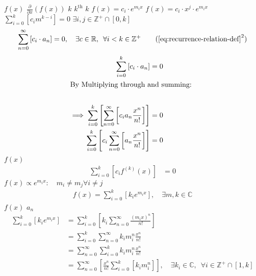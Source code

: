 \documentclass{article}
\begin{document}
$f(x)$
$\frac{\partial }{\partial x}{\left({ f{\left({ x }\right)} }\right)}$
$k$
$k^{\mathrm{th}}$
$k$
$f(x)=c_{i} \cdot e^{m_{i}x}$
$f(x)=c_{i} \cdot x^{j}\cdot e^{m_{i}x}$
$\sum^{k}_{i=0}\left[  c_{i}m^{k-i} \right] = 0$
$\exists i,j \in \mathbb{Z}^{+} \cap \left[0,k\right]$
\begin{align}
\sum^{\infty}_{n= 0}   \left[ c_i \cdot  a_n \right] = 0, \quad \exists c \in
\mathbb{R}, \enspace \forall i<k\in\mathbb{Z}^+ \tag{$\textrm{\ref{eq:recurrence-relation-def}}^2$}
\end{align}
\begin{align}
    \sum^{k}_{i= 0}   {\left[{ c_i \cdot a_n } \right]} = 0 \nonumber \\
    \intertext{By Multiplying through and summing: } \notag \\
     \implies  \sum^{k}_{i= 0}   {\left[{ \sum^{\infty}_{n= 0}   {\left[{ c_i a_n \frac{x^n}{n!} }\right]}  }\right]}  \nonumber = 0 \\
     \sum^{k}_{i= 0}    {\left[{ c_i \sum^{\infty}_{n= 0}   {\left[{  a_n \frac{x^n}{n!} }\right]}  }\right]}  \nonumber = 0 \\
\end{align}
$f{\left({ x }\right)}$
\begin{align}
\sum^{k}_{i= 0}   {\left[{ c_i f^{{\left({ k }\right)} } } {\left({ x }\right)} \right]} \label{eq:exp-gen-def-proof}  &= 0
\end{align}
$f{\left({ x }\right)} \propto e^{m_i x}: \quad m_i \neq m_j \forall i\neq j$
\begin{align}
    f{\left({ x }\right)} = \sum^{k}_{i= 0}   {\left[{ k_i e^{m_i x} }\right]}, \quad \exists m,k \in \mathbb{C} \nonumber
\end{align}
$f{\left({ x }\right)}$
$a_n$
\begin{align}
    \sum^{k}_{i= 0}   {\left[{ k_i e^{m_i x}  }\right]}  &= \sum^{k}_{i= 0}   {\left[{ k_i \sum^{\infty}_{n= 0}   \frac{{\left({ m_i x }\right)}^n}{n!}  }\right]}  \nonumber \\
							 &= \sum^{k}_{i= 0}  \sum^{\infty}_{n= 0}   k_i m_i^n \frac{x^n}{n!} \nonumber\\
							 &=    \sum^{\infty}_{n= 0} \sum^{k}_{i= 0}   k_i m_i^n \frac{x^n}{n!} \nonumber \\
							 &= \sum^{\infty}_{n= 0} {\left[{ \frac{x^n}{n!}  \sum^{k}_{i=0}   {\left[{ k_im^n_i }\right]}  }\right]}, \quad \exists k_i \in \mathbb{C}, \enspace \forall i \in \mathbb{Z}^+\cap {\left[{ 1, k }\right]}     \label{eq:unique-root-sol-power-series-form}
\end{align}
\end{document}
